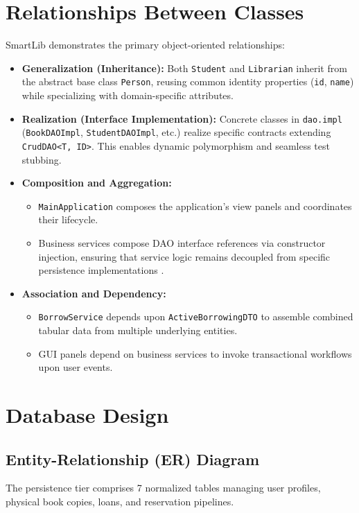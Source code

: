 \section{Relationships Between Classes}
SmartLib demonstrates the primary object-oriented relationships:
\begin{itemize}
    \item \textbf{Generalization (Inheritance):} Both \texttt{Student} and \texttt{Librarian} inherit from the abstract base class \texttt{Person}, reusing common identity properties (\texttt{id}, \texttt{name}) while specializing with domain-specific attributes.
    \item \textbf{Realization (Interface Implementation):} Concrete classes in \texttt{dao.impl} (\texttt{BookDAOImpl}, \texttt{StudentDAOImpl}, etc.) realize specific contracts extending \texttt{CrudDAO<T, ID>}. This enables dynamic polymorphism and seamless test stubbing.
    \item \textbf{Composition and Aggregation:}
    \begin{itemize}
        \item \texttt{MainApplication} composes the application's view panels and coordinates their lifecycle.
        \item Business services compose DAO interface references via constructor injection, ensuring that service logic remains decoupled from specific persistence implementations \cite{gamma1994design}.
    \end{itemize}
    \item \textbf{Association and Dependency:}
    \begin{itemize}
        \item \texttt{BorrowService} depends upon \texttt{ActiveBorrowingDTO} to assemble combined tabular data from multiple underlying entities.
        \item GUI panels depend on business services to invoke transactional workflows upon user events.
    \end{itemize}
\end{itemize}

\section{Database Design}

\subsection{Entity-Relationship (ER) Diagram}
The persistence tier comprises 7 normalized tables managing user profiles, physical book copies, loans, and reservation pipelines.

